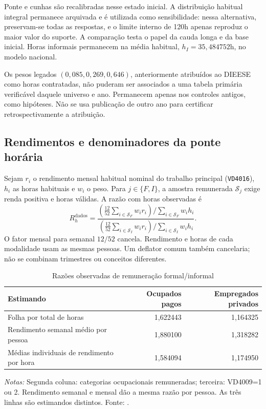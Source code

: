 Ponte e cunhas são recalibradas nesse estado inicial. A distribuição habitual integral permanece arquivada e é utilizada como sensibilidade: nessa alternativa, preservam-se todas as respostas, e o limite interno de 120h apenas reproduz o maior valor do suporte. A comparação testa o papel da cauda longa e da base inicial. Horas informais permanecem na média habitual, $h_I=35{,}484752$h, no modelo nacional.

Os pesos legados $(0{,}085,0{,}269,0{,}646)$, anteriormente atribuídos ao DIEESE como horas contratadas, não puderam ser associados a uma tabela primária verificável daquele universo e ano. Permanecem apenas nos controles antigos, como hipóteses. Não se usa publicação de outro ano para certificar retrospectivamente a atribuição.

\subsection{Rendimentos e denominadores da ponte horária}
Sejam $r_i$ o rendimento mensal habitual nominal do trabalho principal (\texttt{VD4016}), $h_i$ as horas habituais e $w_i$ o peso. Para $j\in\{F,I\}$, a amostra remunerada $\mathcal S_j$ exige renda positiva e horas válidas. A razão com horas observadas é
\begin{equation}\label{eq:app_observed_bridge}
R_h^{\mathrm{dados}}=
\frac{\left(\frac{12}{52}\sum_{i\in\mathcal S_F}w_i r_i\right)/\sum_{i\in\mathcal S_F}w_i h_i}
{\left(\frac{12}{52}\sum_{i\in\mathcal S_I}w_i r_i\right)/\sum_{i\in\mathcal S_I}w_i h_i}.
\end{equation}
O fator mensal para semanal $12/52$ cancela. Rendimento e horas de cada modalidade usam as mesmas pessoas. Um deflator comum também cancelaria; não se combinam trimestres ou conceitos diferentes.
\begin{table}[htbp]
\centering
\caption{Razões observadas de remuneração formal/informal}
\label{tab:app_wage_bridge}
\normalsize
\begin{tabular}{@{}p{7.1cm}rr@{}}
\toprule
Estimando & Ocupados pagos & Empregados privados \\
\midrule
Folha por total de horas & 1,622443 & 1,164325 \\
Rendimento semanal médio por pessoa & 1,880100 & 1,318282 \\
Médias individuais de rendimento por hora & 1,584094 & 1,174950 \\
\bottomrule
\end{tabular}
\begin{minipage}{0.96\textwidth}\normalsize
\textit{Notas:} Segunda coluna: categorias ocupacionais remuneradas; terceira: VD4009=1 ou 2. Rendimento semanal e mensal dão a mesma razão por pessoa. As três linhas são estimandos distintos. Fonte: \citet{PNAD2024T4Microdados}.
\end{minipage}
\end{table}

